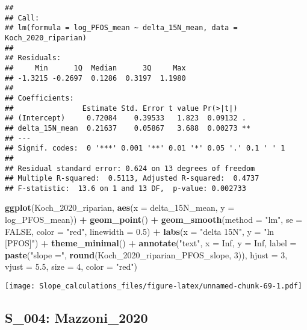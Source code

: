 \documentclass[
]{article}
\newenvironment{Shaded}{\begin{snugshade}}{\end{snugshade}}
\newcommand{\AttributeTok}[1]{\textcolor[rgb]{0.13,0.29,0.53}{#1}}
\newcommand{\ConstantTok}[1]{\textcolor[rgb]{0.56,0.35,0.01}{#1}}
\newcommand{\DecValTok}[1]{\textcolor[rgb]{0.00,0.00,0.81}{#1}}
\newcommand{\FloatTok}[1]{\textcolor[rgb]{0.00,0.00,0.81}{#1}}
\newcommand{\FunctionTok}[1]{\textcolor[rgb]{0.13,0.29,0.53}{\textbf{#1}}}
\newcommand{\NormalTok}[1]{#1}
\newcommand{\SpecialCharTok}[1]{\textcolor[rgb]{0.81,0.36,0.00}{\textbf{#1}}}
\newcommand{\StringTok}[1]{\textcolor[rgb]{0.31,0.60,0.02}{#1}}
\begin{document}
\begin{verbatim}
## 
## Call:
## lm(formula = log_PFOS_mean ~ delta_15N_mean, data = Koch_2020_riparian)
## 
## Residuals:
##     Min      1Q  Median      3Q     Max 
## -1.3215 -0.2697  0.1286  0.3197  1.1980 
## 
## Coefficients:
##                Estimate Std. Error t value Pr(>|t|)   
## (Intercept)     0.72084    0.39533   1.823  0.09132 . 
## delta_15N_mean  0.21637    0.05867   3.688  0.00273 **
## ---
## Signif. codes:  0 '***' 0.001 '**' 0.01 '*' 0.05 '.' 0.1 ' ' 1
## 
## Residual standard error: 0.624 on 13 degrees of freedom
## Multiple R-squared:  0.5113, Adjusted R-squared:  0.4737 
## F-statistic:  13.6 on 1 and 13 DF,  p-value: 0.002733
\end{verbatim}

\begin{Shaded}
\begin{Highlighting}[]
\FunctionTok{ggplot}\NormalTok{(Koch\_2020\_riparian, }\FunctionTok{aes}\NormalTok{(}\AttributeTok{x =}\NormalTok{ delta\_15N\_mean, }\AttributeTok{y =}\NormalTok{ log\_PFOS\_mean)) }\SpecialCharTok{+}
  \FunctionTok{geom\_point}\NormalTok{() }\SpecialCharTok{+}
  \FunctionTok{geom\_smooth}\NormalTok{(}\AttributeTok{method =} \StringTok{"lm"}\NormalTok{, }\AttributeTok{se =} \ConstantTok{FALSE}\NormalTok{, }\AttributeTok{color =} \StringTok{"red"}\NormalTok{, }\AttributeTok{linewidth =} \FloatTok{0.5}\NormalTok{) }\SpecialCharTok{+}
  \FunctionTok{labs}\NormalTok{(}\AttributeTok{x =} \StringTok{"delta 15N"}\NormalTok{,}
       \AttributeTok{y =} \StringTok{"ln [PFOS]"}\NormalTok{) }\SpecialCharTok{+}
  \FunctionTok{theme\_minimal}\NormalTok{() }\SpecialCharTok{+}
  \FunctionTok{annotate}\NormalTok{(}\StringTok{"text"}\NormalTok{, }\AttributeTok{x =} \ConstantTok{Inf}\NormalTok{, }\AttributeTok{y =} \ConstantTok{Inf}\NormalTok{, }\AttributeTok{label =} \FunctionTok{paste}\NormalTok{(}\StringTok{"slope ="}\NormalTok{, }\FunctionTok{round}\NormalTok{(Koch\_2020\_riparian\_PFOS\_slope, }\DecValTok{3}\NormalTok{)), }
           \AttributeTok{hjust =} \DecValTok{3}\NormalTok{, }\AttributeTok{vjust =} \FloatTok{5.5}\NormalTok{, }\AttributeTok{size =} \DecValTok{4}\NormalTok{, }\AttributeTok{color =} \StringTok{"red"}\NormalTok{)}
\end{Highlighting}
\end{Shaded}

\texttt{[image: Slope\_calculations\_files/figure-latex/unnamed-chunk-69-1.pdf]}

\subsection{S\_004: Mazzoni\_2020}\label{s_004-mazzoni_2020-1}
\end{document}
